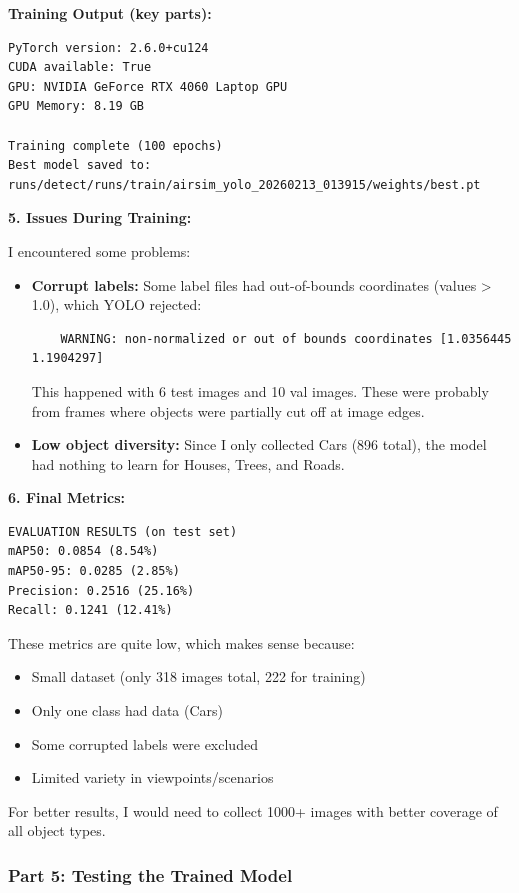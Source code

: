 \textbf{Training Output (key parts):}
\begin{verbatim}
PyTorch version: 2.6.0+cu124
CUDA available: True
GPU: NVIDIA GeForce RTX 4060 Laptop GPU
GPU Memory: 8.19 GB

Training complete (100 epochs)
Best model saved to: runs/detect/runs/train/airsim_yolo_20260213_013915/weights/best.pt
\end{verbatim}

\textbf{5. Issues During Training:}

I encountered some problems:
\begin{itemize}
	\item \textbf{Corrupt labels:} Some label files had out-of-bounds coordinates (values > 1.0), which YOLO rejected:
	\begin{verbatim}
	WARNING: non-normalized or out of bounds coordinates [1.0356445 1.1904297]
	\end{verbatim}
	This happened with 6 test images and 10 val images. These were probably from frames where objects were partially cut off at image edges.
	
	\item \textbf{Low object diversity:} Since I only collected Cars (896 total), the model had nothing to learn for Houses, Trees, and Roads.
\end{itemize}

\textbf{6. Final Metrics:}

\begin{verbatim}
EVALUATION RESULTS (on test set)
mAP50: 0.0854 (8.54%)
mAP50-95: 0.0285 (2.85%)
Precision: 0.2516 (25.16%)
Recall: 0.1241 (12.41%)
\end{verbatim}

These metrics are quite low, which makes sense because:
\begin{itemize}
	\item Small dataset (only 318 images total, 222 for training)
	\item Only one class had data (Cars)
	\item Some corrupted labels were excluded
	\item Limited variety in viewpoints/scenarios
\end{itemize}

For better results, I would need to collect 1000+ images with better coverage of all object types.

\clearpage

\subsubsection{Part 5: Testing the Trained Model}

